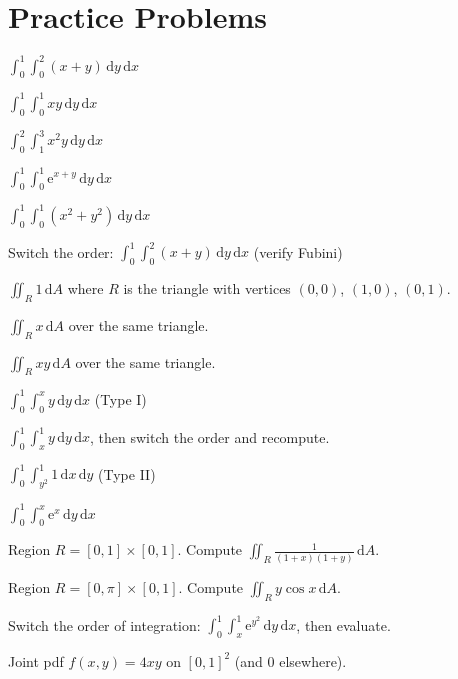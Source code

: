 \section{Practice Problems}

\begin{problems}
  \item $\displaystyle\int_{0}^{1}\int_{0}^{2} (x+y)\,\mathrm{d}y\,\mathrm{d}x$
  \item $\displaystyle\int_{0}^{1}\int_{0}^{1} xy\,\mathrm{d}y\,\mathrm{d}x$
  \item $\displaystyle\int_{0}^{2}\int_{1}^{3} x^{2}y\,\mathrm{d}y\,\mathrm{d}x$
  \item $\displaystyle\int_{0}^{1}\int_{0}^{1} \mathrm{e}^{x+y}\,\mathrm{d}y\,\mathrm{d}x$
  \item $\displaystyle\int_{0}^{1}\int_{0}^{1} (x^{2}+y^{2})\,\mathrm{d}y\,\mathrm{d}x$
  \item Switch the order:
        $\displaystyle\int_{0}^{1}\int_{0}^{2} (x+y)\,\mathrm{d}y\,\mathrm{d}x$
        (verify Fubini)
  \item $\displaystyle\iint_{R} 1\,\mathrm{d}A$ where $R$ is the triangle
        with vertices $(0,0)$, $(1,0)$, $(0,1)$.
  \item $\displaystyle\iint_{R} x\,\mathrm{d}A$ over the same triangle.
  \item $\displaystyle\iint_{R} xy\,\mathrm{d}A$ over the same triangle.
  \item $\displaystyle\int_{0}^{1}\int_{0}^{x} y\,\mathrm{d}y\,\mathrm{d}x$
        \quad (Type I)
  \item $\displaystyle\int_{0}^{1}\int_{x}^{1} y\,\mathrm{d}y\,\mathrm{d}x$,
        then switch the order and recompute.
  \item $\displaystyle\int_{0}^{1}\int_{y^{2}}^{1} 1\,\mathrm{d}x\,\mathrm{d}y$
        \quad (Type II)
  \item $\displaystyle\int_{0}^{1}\int_{0}^{x} \mathrm{e}^{x}\,\mathrm{d}y\,\mathrm{d}x$
  \item Region $R=[0,1]\times[0,1]$. Compute
        $\displaystyle\iint_{R} \frac{1}{(1+x)(1+y)}\,\mathrm{d}A$.
  \item Region $R=[0,\pi]\times[0,1]$. Compute
        $\displaystyle\iint_{R} y\cos x\,\mathrm{d}A$.
  \item Switch the order of integration:
        $\displaystyle\int_{0}^{1}\int_{x}^{1} \mathrm{e}^{y^{2}}\,\mathrm{d}y\,\mathrm{d}x$,
        then evaluate.
  \item Joint pdf $f(x,y)=4xy$ on $[0,1]^{2}$ (and $0$ elsewhere).

\end{problems}
